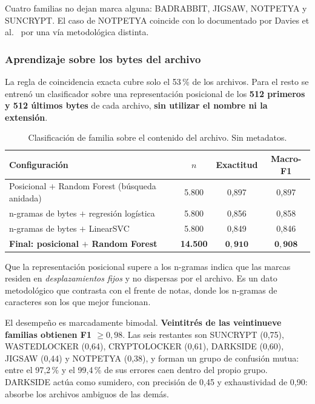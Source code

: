 \documentclass[11pt,a4paper]{article}
\begin{document}
Cuatro familias no dejan marca alguna: BADRABBIT, JIGSAW, NOTPETYA y SUNCRYPT. El caso de
NOTPETYA coincide con lo documentado por Davies et al.\ \cite{davies2023} por una vía
metodológica distinta.

\subsubsection{Aprendizaje sobre los bytes del archivo}

La regla de coincidencia exacta cubre solo el 53\,\% de los archivos. Para el resto se
entrenó un clasificador sobre una representación posicional de los \textbf{512 primeros y 512
últimos bytes} de cada archivo, \textbf{sin utilizar el nombre ni la extensión}.

\begin{table}[h]
\centering\small
\caption{Clasificación de familia sobre el contenido del archivo. Sin metadatos.}
\begin{tabular}{@{}lccc@{}}
\toprule
\textbf{Configuración} & \textbf{$n$} & \textbf{Exactitud} & \textbf{Macro-F1} \\
\midrule
Posicional $+$ Random Forest (búsqueda anidada) & 5.800 & 0,897 & 0,897 \\
n-gramas de bytes $+$ regresión logística & 5.800 & 0,856 & 0,858 \\
n-gramas de bytes $+$ LinearSVC & 5.800 & 0,849 & 0,846 \\
\textbf{Final: posicional $+$ Random Forest} & \textbf{14.500} & $\mathbf{0{,}910}$ & $\mathbf{0{,}908}$ \\
\bottomrule
\end{tabular}
\end{table}

Que la representación posicional supere a los n-gramas indica que las marcas residen en
\emph{desplazamientos fijos} y no dispersas por el archivo. Es un dato metodológico que
contrasta con el frente de notas, donde los n-gramas de caracteres son los que mejor funcionan.

El desempeño es marcadamente bimodal. \textbf{Veintitrés de las veintinueve familias obtienen
F1 $\geq 0{,}98$}. Las seis restantes son SUNCRYPT (0,75), WASTEDLOCKER (0,64), CRYPTOLOCKER
(0,61), DARKSIDE (0,60), JIGSAW (0,44) y NOTPETYA (0,38), y forman un grupo de confusión
mutua: entre el 97,2\,\% y el 99,4\,\% de sus errores caen dentro del propio grupo. DARKSIDE
actúa como sumidero, con precisión de 0,45 y exhaustividad de 0,90: absorbe los archivos
ambiguos de las demás.
\end{document}
